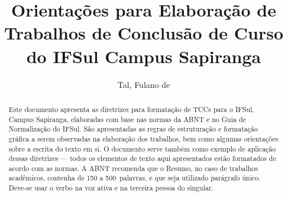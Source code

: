 \documentclass{ifsultcc}
\author{Tal, Fulano de}
\title{Orientações para Elaboração de Trabalhos de Conclusão de Curso
do IFSul Campus Sapiranga}
\begin{document}
\capa
\folhaderosto

%
%

%


%
\begin{abstract}
Este documento apresenta as diretrizes para formatação de TCCs para o IFSul, Campus Sapiranga, elaboradas com base nas normas da ABNT e no Guia de Normalização do IFSul.  São apresentadas as regras de estruturação e formatação gráfica a serem observadas na elaboração dos trabalhos, bem como algumas orientações sobre a escrita do texto em si.  O documento serve também como exemplo de aplicação dessas diretrizes --- todos os elementos de texto aqui apresentados estão formatados de acordo com as normas.  A ABNT recomenda que o Resumo, no caso de trabalhos acadêmicos, contenha de 150 a 500~palavras, e que seja utilizado parágrafo único. Deve-se usar o verbo na voz ativa e na terceira pessoa do singular.
\end{abstract}
\end{document}
